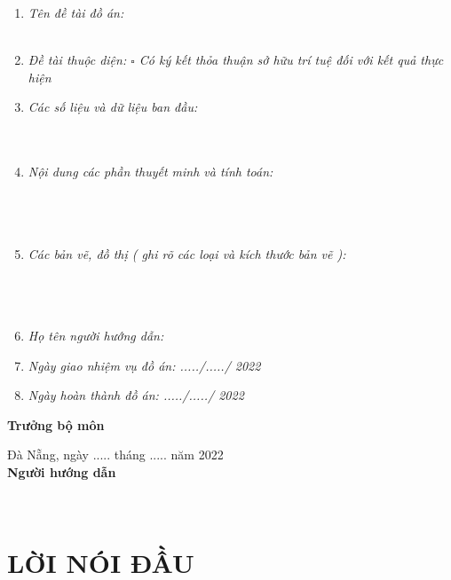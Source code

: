 \documentclass[11pt]{report}
\newcommand{\at}{Đà Nẵng, ngày ..... tháng ..... năm 2022}
\begin{document}
	\begin{enumerate}
		\item\emph{Tên đề tài đồ án: \\\dotfill\\\dotfill}
		\item\emph{Đề tài thuộc diện: $\square$ Có ký kết thỏa thuận sở hữu trí tuệ đối với kết quả thực hiện}
		\item\emph{Các số liệu và dữ liệu ban đầu:\\\dotfill\\\dotfill\\\dotfill}
		\item\emph{Nội dung các phần thuyết minh và tính toán:}
		\\\dotfill\\\dotfill\\\dotfill\\\dotfill
		\item\emph{Các bản vẽ, đồ thị ( ghi rõ các loại và kích thước bản vẽ ):}
		\\\dotfill\\\dotfill\\\dotfill\\\dotfill
		\item\emph{Họ tên người hướng dẫn: \dotfill}
		\item\emph{Ngày giao nhiệm vụ đồ án: ...../...../ 2022 \dotfill}
		\item\emph{Ngày hoàn thành đồ án: ...../...../ 2022 \dotfill}
		
	\end{enumerate}
	\raggedright
	\begin{minipage}[t]{.5\textwidth}
		
		\textbf{Trưởng bộ môn} \dotfill
	\end{minipage}\hfill 
	\begin{minipage}[t]{.5\textwidth}
		\center
		\at\\
		\textbf{Người hướng dẫn}
	\end{minipage}\\[2em]
	
	\pagebreak
	
	\setcounter{page}{1}
	
	\chapter*{LỜI NÓI ĐẦU}
	\fontsize{13px}{13px}\selectfont\justifying
	
\end{document}

